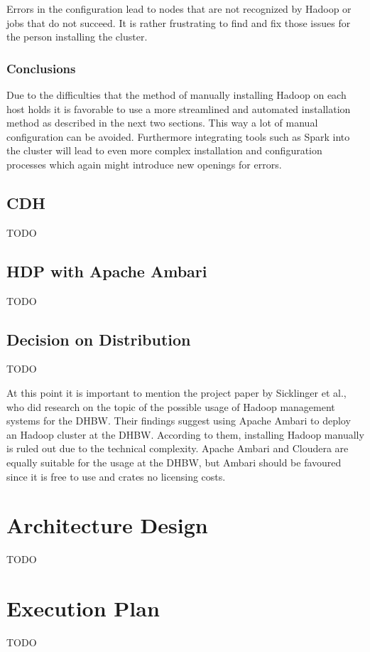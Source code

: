 Errors in the configuration lead to nodes that are not recognized by Hadoop or jobs that do not succeed.
It is rather frustrating to find and fix those issues for the person installing the cluster.

\subsubsection{Conclusions}

Due to the difficulties that the method of manually installing Hadoop on each host holds it is favorable to use a more streamlined 
and automated installation method as described in the next two sections.
This way a lot of manual configuration can be avoided.
Furthermore integrating tools such as Spark into the cluster 
will lead to even more complex installation and configuration processes which again might introduce new openings for errors.

\subsection{\acl{CDH}}

TODO

\subsection{\acl{HDP} with Apache Ambari}

TODO



\subsection{Decision on Distribution}

TODO

At this point it is important to mention the project paper by Sicklinger et al., 
who did research on the topic of the possible usage of Hadoop management systems for the \ac{DHBW}.
Their findings suggest using Apache Ambari to deploy an Hadoop cluster at the \ac{DHBW}.
According to them, installing Hadoop manually is ruled out due to the technical complexity.
Apache Ambari and Cloudera are equally suitable for the usage at the \ac{DHBW}, 
but Ambari should be favoured since it is free to use and crates no licensing costs.
\autocite[][p. 53f]{wi2018managementsystems}

\section{Architecture Design}

TODO

\section{Execution Plan}

TODO
